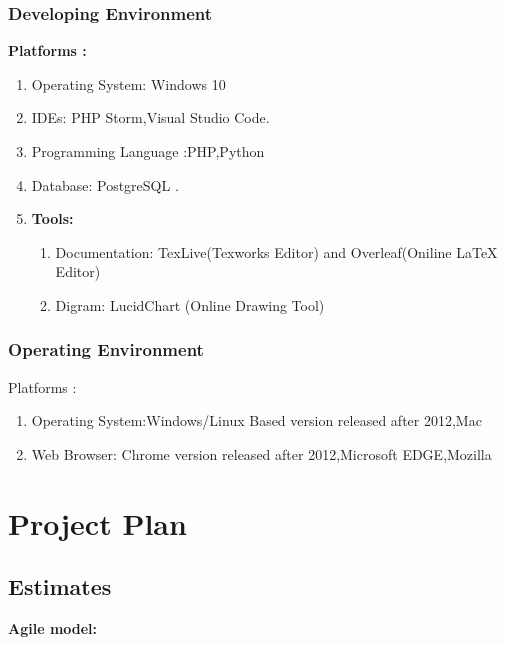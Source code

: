 \documentclass[11pt,fleqn]{book} %
\begin{document}
\subsection{\textbf{Developing Environment }}
\textbf{Platforms :}
\begin{enumerate}
\item Operating System: Windows 10
\item IDEs: PHP Storm,Visual Studio Code.
\item Programming Language :PHP,Python
\item Database: PostgreSQL .

\item \textbf{Tools:}\\
\begin{enumerate}
    \item Documentation: TexLive(Texworks Editor) and Overleaf(Oniline LaTeX Editor)
    \item Digram: LucidChart (Online Drawing Tool)
\end{enumerate}
\end{enumerate}

\subsection{\textbf{Operating Environment }}
Platforms : 
\begin{enumerate}
\item Operating System:Windows/Linux Based version released after 2012,Mac
\item Web Browser: Chrome version released after 2012,Microsoft EDGE,Mozilla
\end{enumerate}


\chapter{Project Plan}

\section{Estimates}
\textbf{Agile model:}\\
\end{document}
